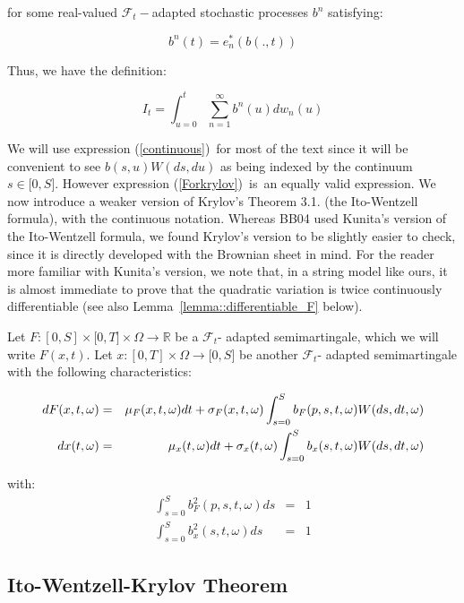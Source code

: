 \documentclass{article}
\begin{document}
for some real-valued $\mathcal{F}_{t}-$adapted stochastic processes $b^{n}$
satisfying:

\begin{equation*}
b^{n}(t)=e_{n}^{\ast }(b(.,t))
\end{equation*}

Thus, we have the definition:

\begin{equation}
I_{t}=\int_{u=0}^{t}\sum_{n=1}^{\infty }b^{n}(u)dw_{n}(u)  \label{Forkrylov}
\end{equation}

We will use expression (\ref{continuous})\ for most of the text since it
will be convenient to see $b(s,u)W(ds,du)$ as being indexed by the continuum
$s\in \lbrack 0,S]$. However expression (\ref{Forkrylov})\ is\ an equally
valid expression. We now introduce a weaker version of Krylov's \cite{Kry09}
Theorem 3.1. (the Ito-Wentzell formula), with the continuous notation.
Whereas BB04 used Kunita's version of the Ito-Wentzell formula, we found
Krylov's version to be slightly easier to check, since it is directly
developed with the Brownian sheet in mind. For the reader more familiar with
Kunita's version, we note that, in a string model like ours, it is almost
immediate to prove that the quadratic variation is twice continuously
differentiable (see also Lemma~\ref{lemma::differentiable_F} below).

\bigskip

Let $F:[0,S]\times \lbrack 0,T]\times \Omega \rightarrow \mathbb{R}$ be a $%
\mathcal{F}_{t}$- adapted semimartingale, which we will write $F(x,t)$. Let $%
x:[0,T]\times \Omega \rightarrow \lbrack 0,S]$ be another $\mathcal{F}_{t}$-
adapted semimartingale with the following characteristics:

\begin{eqnarray}
dF(x,t,\omega ) &=&\mu _{F}(x,t,\omega )dt+\sigma _{F}(x,t,\omega
)\int_{s=0}^{S}b_{F}(p,s,t,\omega )W(ds,dt,\omega )  \label{dQ} \\
dx(t,\omega ) &=&\mu _{x}(t,\omega )dt+\sigma _{x}(t,\omega
)\int_{s=0}^{S}b_{x}(s,t,\omega )W(ds,dt,\omega )  \notag
\end{eqnarray}

with:%
\begin{eqnarray*}
\int_{s=0}^{S}b_{F}^{2}(p,s,t,\omega )ds &=&1 \\
\int_{s=0}^{S}b_{x}^{2}(s,t,\omega )ds &=&1
\end{eqnarray*}%
\bigskip

\subsection{Ito-Wentzell-Krylov Theorem}
\end{document}
